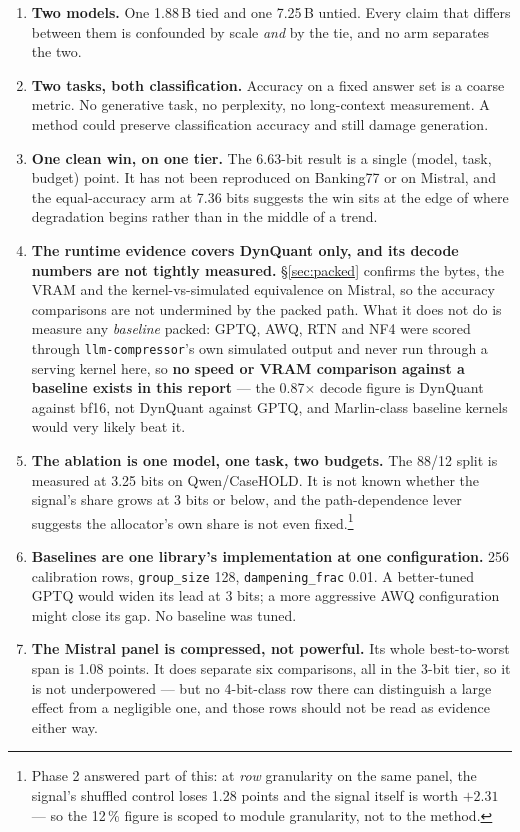 \documentclass[11pt]{article}
\newcommand{\x}{\texorpdfstring{$\times$}{x}}
\newcommand{\pct}{\,\%}
\newcommand{\code}[1]{\texttt{#1}}
\begin{document}
\begin{enumerate}[leftmargin=1.4em]
\item \textbf{Two models.} One 1.88\,B tied and one 7.25\,B untied. Every claim that differs
between them is confounded by scale \emph{and} by the tie, and no arm separates the two.

\item \textbf{Two tasks, both classification.} Accuracy on a fixed answer set is a coarse metric.
No generative task, no perplexity, no long-context measurement. A method could preserve
classification accuracy and still damage generation.

\item \textbf{One clean win, on one tier.} The 6.63-bit result is a single (model, task, budget)
point. It has not been reproduced on Banking77 or on Mistral, and the equal-accuracy arm at 7.36
bits suggests the win sits at the edge of where degradation begins rather than in the middle of a
trend.

\item \textbf{The runtime evidence covers DynQuant only, and its decode numbers are not tightly
measured.} \S\ref{sec:packed} confirms the bytes, the VRAM and the kernel-vs-simulated equivalence
on Mistral, so the accuracy comparisons are not undermined by the packed path. What it does not do
is measure any \emph{baseline} packed: GPTQ, AWQ, RTN and NF4 were scored through
\code{llm-compressor}'s own simulated output and never run through a serving kernel here, so
\textbf{no speed or VRAM comparison against a baseline exists in this report} --- the 0.87\x{}
decode figure is DynQuant against bf16, not DynQuant against GPTQ, and Marlin-class baseline
kernels would very likely beat it.

\item \textbf{The ablation is one model, one task, two budgets.} The 88/12 split is measured at
3.25 bits on Qwen/CaseHOLD. It is not known whether the signal's share grows at 3 bits or below,
and the path-dependence lever suggests the allocator's own share is not even fixed.\footnote{Phase
2 answered part of this: at \emph{row} granularity on the same panel, the signal's shuffled control
loses 1.28 points and the signal itself is worth $+2.31$ --- so the 12\pct{} figure is scoped to
module granularity, not to the method.}

\item \textbf{Baselines are one library's implementation at one configuration.} 256 calibration
rows, \code{group\_size} 128, \code{dampening\_frac} 0.01. A better-tuned GPTQ would widen its lead
at 3 bits; a more aggressive AWQ configuration might close its gap. No baseline was tuned.

\item \textbf{The Mistral panel is compressed, not powerful.} Its whole best-to-worst span is 1.08
points. It does separate six comparisons, all in the 3-bit tier, so it is not underpowered --- but
no 4-bit-class row there can distinguish a large effect from a negligible one, and those rows
should not be read as evidence either way.
\end{enumerate}
\end{document}

